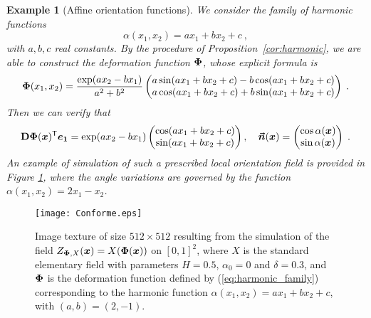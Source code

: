 \documentclass{elsarticle}
\newtheorem{proposition}{Proposition}
\newtheorem{example}{Example}
\begin{document}
\begin{example}[Affine orientation functions]
We consider the family of harmonic functions $$\alpha(x_1,x_2)=ax_1+bx_2+c~,$$
 with $a,b,c$ real constants. By the procedure of Proposition~\ref{cor:harmonic}, we are able to construct the deformation function $\mathbf{\Phi}$, whose explicit formula is
\begin{equation}\label{eq:harmonic_family}
\mathbf{\Phi}(x_1,x_2)=\frac{\exp(ax_2-bx_1)}{a^2+b^2}\begin{pmatrix}a\sin(ax_1+bx_2+c)-b\cos(ax_1+bx_2+c)\\ a\cos(ax_1+bx_2+c)+b\sin(ax_1+bx_2+c)\end{pmatrix}\;.
\end{equation}
Then we can verify that 
\[
\mathbf{D}\mathbf{\Phi}(\bm{x})^{\mathsf{T}}\bm{e_1}=\exp(ax_2-bx_1)\begin{pmatrix}\cos(ax_1+bx_2+c)\\ \sin(ax_1+bx_2+c)\end{pmatrix},\quad \bm{\vec n}(\bm{x})=\begin{pmatrix}\cos \alpha(\bm{x})\\ \sin \alpha(\bm{x})\end{pmatrix}\;.
\]
An example of simulation of such a prescribed local orientation field is provided in Figure \ref{fig:harmonic_simu}, where the angle variations are governed by the function $\alpha(x_1,x_2)=2x_1-x_2$.
\end{example}

\begin{figure}
\centering
\texttt{[image: Conforme.eps]} 
\caption{Image texture of size $512\times 512$ resulting from the simulation of the field $Z_{\mathbf{\Phi},X}(\bm{x})=X(\mathbf{\Phi}(\bm{x}))$ on $[0,1]^2$, where $X$ is the standard elementary field with parameters $H=0.5$, $\alpha_0=0$ and $\delta=0.3$, and $\mathbf{\Phi}$ is the deformation function defined by (\ref{eq:harmonic_family}) corresponding to the harmonic function $\alpha(x_1,x_2)=ax_1+bx_2+c$, with $(a,b)=(2,-1)$.}
\label{fig:harmonic_simu}
\end{figure}

\end{document}
